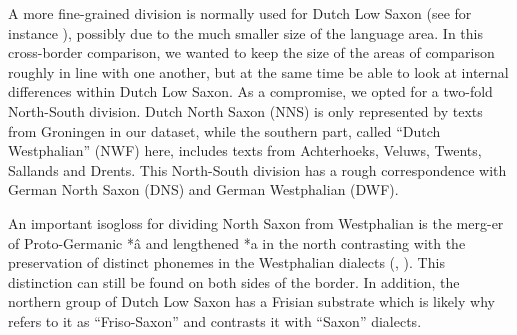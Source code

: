 \documentclass[output=paper,colorlinks,citecolor=brown]{langscibook}
\begin{document}
A more fine-grained division is normally used for Dutch Low Saxon (see for instance \citealt[20]{BloemhoffEtAl2019}), possibly due to the much smaller size of the language area. In this cross-border comparison, we wanted to keep the size of the areas of comparison roughly in line with one another, but at the same time be able to look at internal differences within Dutch Low Saxon. As a compromise, we opted for a two-fold North-South division. Dutch North Saxon (NNS) is only represented by texts from Groningen in our dataset, while the southern part, called “Dutch Westphalian” (NWF) here, includes texts from Achterhoeks, Veluws, Twents, Sallands and Drents. This North-South division has a rough correspondence with German North Saxon (DNS) and German Westphalian (DWF).  

An important isogloss for dividing North Saxon from Westphalian is the merg\hyp er of Proto-Germanic *â and lengthened *a in the north contrasting with the preservation of distinct phonemes in the Westphalian dialects (\citealt{Niebaum2008}, \citealt{BloemhoffEtAl2019}). This distinction can still be found on both sides of the border.
In addition, the northern group of Dutch Low Saxon has a Frisian substrate which is likely why \citet{Jellinghaus1892}  refers to it as “Friso\hyp Saxon” and contrasts it with “Saxon” dialects. 


\end{document}
